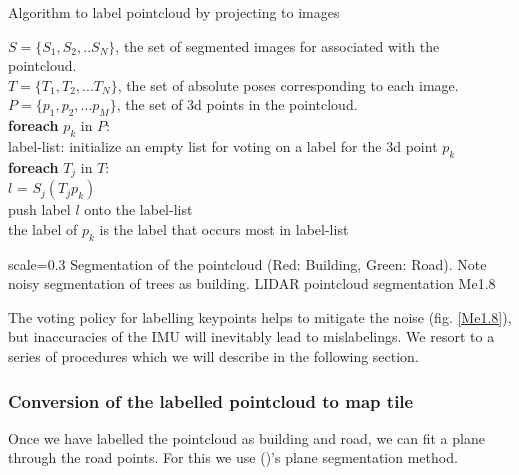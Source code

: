 \begin{algorithm}
\caption{Algorithm to label pointcloud by projecting to images}
\begin{algorithmic}
\REQUIRE $S = \{S_1, S_2,..S_N\}$, the set of segmented images for associated with the pointcloud.\\
$T = \{T_1, T_2,...T_N\}$, the set of absolute poses corresponding to each image.\\
$P = \{p_1, p_2, ...p_M\}$, the set of 3d points in the pointcloud. \\
\vspace{5 mm}
\textbf{foreach} $p_k$ in $P$:\\
   
   \hspace{5 mm} label-list: initialize an empty list for voting on a label for the 3d point $p_k$\\
    \hspace{5 mm}\textbf{foreach} $T_j$ in $T$:\\
      \hspace{5 mm}\hspace{5 mm}$l$ = $S_j(T_j p_k)$\\
      \hspace{5 mm}\hspace{5 mm}push label $l$ onto the label-list\\
the label of $p_k$ is the label that occurs most in label-list\\
\end{algorithmic}
\end{algorithm}

{scale=0.3}%
{Segmentation of the pointcloud (Red: Building, Green: Road). Note noisy segmentation of trees as building.}%
{LIDAR pointcloud segmentation}%
{Me1.8}

The voting policy for labelling keypoints helps to mitigate the noise (fig. \ref{Me1.8}), but inaccuracies of the IMU will inevitably lead to mislabelings. We resort to a series of procedures which we will describe in the following section.

\subsubsection{Conversion of the labelled pointcloud to map tile}
Once we have labelled the pointcloud as building and road, we can fit a plane through the road points. For this we use (\cite{zhou2018})'s plane segmentation method.

